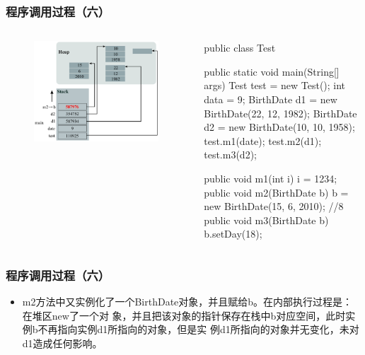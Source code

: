\documentclass[hyperref={pdfpagelabels=false},compress,table]{beamer} %
\begin{document}
\begin{frame}[fragile] %
\frametitle{程序调用过程（六）}

\begin{columns}
\begin{figure}
\centering
\includegraphics[width=0.98\textwidth]{fig06.pdf}
\end{figure}

\begin{javaCode}\small
public class Test {
  public static void main(String[] args) {
    Test test = new Test(); 
    int data = 9; 
    BirthDate d1 = new BirthDate(22, 12, 1982); 
    BirthDate d2 = new BirthDate(10, 10, 1958); 
    test.m1(date); 
    test.m2(d1); 
    test.m3(d2);
  }

  public void m1(int i) {
    i = 1234; 
  }
  public void m2(BirthDate b) { 
    b = new BirthDate(15, 6, 2010); //8
  }
  public void m3(BirthDate b) {
    b.setDay(18);
  }
}
\end{javaCode}
\end{columns}
\end{frame}

\begin{frame}[fragile] %
\frametitle{程序调用过程（六）}
\begin{itemize}
\item m2方法中又实例化了一个BirthDate对象，并且赋给b。在内部执行过程是：在堆区new了一个对
  象，并且把该对象的指针保存在栈中b对应空间，此时实例b不再指向实例d1所指向的对象，但是实
  例d1所指向的对象并无变化，未对d1造成任何影响。
\end{itemize}
\end{frame}
\end{document}
